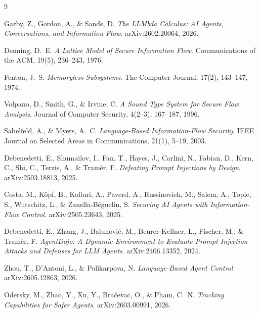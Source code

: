 \documentclass[11pt, a4paper]{article}
\begin{document}
\begin{thebibliography}{9}

Garby, Z., Gordon, A., \& Sands, D.
\newblock \emph{The LLMbda Calculus: AI Agents, Conversations, and
Information Flow}.
\newblock arXiv:2602.20064, 2026.

Denning, D.~E.
\newblock \emph{A Lattice Model of Secure Information Flow}.
\newblock Communications of the ACM, 19(5), 236--243, 1976.

Fenton, J.~S.
\newblock \emph{Memoryless Subsystems}.
\newblock The Computer Journal, 17(2), 143--147, 1974.

Volpano, D., Smith, G., \& Irvine, C.
\newblock \emph{A Sound Type System for Secure Flow Analysis}.
\newblock Journal of Computer Security, 4(2--3), 167--187, 1996.

Sabelfeld, A., \& Myers, A.~C.
\newblock \emph{Language-Based Information-Flow Security}.
\newblock IEEE Journal on Selected Areas in Communications, 21(1), 5--19, 2003.

Debenedetti, E., Shumailov, I., Fan, T., Hayes, J., Carlini, N., Fabian,
D., Kern, C., Shi, C., Terzis, A., \& Tram\`er, F.
\newblock \emph{Defeating Prompt Injections by Design}.
\newblock arXiv:2503.18813, 2025.

Costa, M., K\"opf, B., Kolluri, A., Paverd, A., Russinovich, M., Salem,
A., Tople, S., Wutschitz, L., \& Zanella-B\'eguelin, S.
\newblock \emph{Securing AI Agents with Information-Flow Control}.
\newblock arXiv:2505.23643, 2025.

Debenedetti, E., Zhang, J., Balunovi\'c, M., Beurer-Kellner, L.,
Fischer, M., \& Tram\`er, F.
\newblock \emph{AgentDojo: A Dynamic Environment to Evaluate Prompt
Injection Attacks and Defenses for LLM Agents}.
\newblock arXiv:2406.13352, 2024.

Zhou, T., D'Antoni, L., \& Polikarpova, N.
\newblock \emph{Language-Based Agent Control}.
\newblock arXiv:2605.12863, 2026.

Odersky, M., Zhao, Y., Xu, Y., Bra\v{c}evac, O., \& Pham, C.~N.
\newblock \emph{Tracking Capabilities for Safer Agents}.
\newblock arXiv:2603.00991, 2026.

\end{thebibliography}
\end{document}
